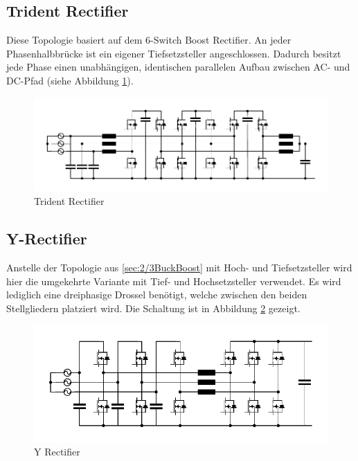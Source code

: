	\subsection{Trident Rectifier}
		Diese Topologie basiert auf dem 6-Switch Boost Rectifier. An jeder Phasenhalbbrücke ist ein eigener Tiefsetzsteller angeschlossen. Dadurch besitzt jede Phase einen unabhängigen, identischen parallelen Aufbau zwischen AC- und DC-Pfad (siehe Abbildung \ref{fig:trident}). 
		\begin{figure}[H]
			\centering
			\includegraphics[width=0.9\linewidth]{content/Grafiken/Trident}
			\caption{Trident Rectifier}
			\label{fig:trident}
		\end{figure}
		
	\subsection{Y-Rectifier}
		Anstelle der Topologie aus \ref{sec:2/3BuckBoost} mit Hoch- und Tiefsetzsteller wird hier die umgekehrte Variante mit Tief- und Hochsetzsteller verwendet. Es wird lediglich eine dreiphasige Drossel benötigt, welche zwischen den beiden Stellgliedern platziert wird. Die Schaltung ist in Abbildung \ref{fig:y-rectifier} gezeigt.
		
	
		\begin{figure}[H]
			\centering
			\includegraphics[width=0.9\linewidth]{content/Grafiken/Y-Rectifier}
			\caption{Y Rectifier}
			\label{fig:y-rectifier}
		\end{figure}
	
